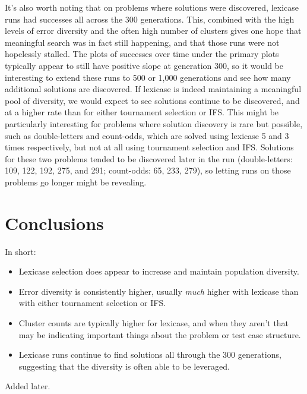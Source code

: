 It's also worth noting that on problems where solutions were discovered, lexicase runs had successes 
all across the 300 generations. This, combined with the high levels of error diversity and the often 
high number of clusters gives one hope that meaningful search was in fact still happening, and that 
those runs were not hopelessly stalled. The plots of successes over time under the primary plots
typically appear to still have positive slope at generation 300, so it would be interesting to
extend these runs to 500 or 1,000 generations and see how many additional solutions are discovered.
If lexicase is indeed maintaining a meaningful pool of diversity, we would expect to see solutions continue
to be discovered, and at a higher rate than for either tournament selection or IFS. This might be
particularly interesting for problems where solution discovery is rare but possible, such as
double-letters and count-odds, which are solved using lexicase 5 and 3 times respectively, but not
at all using tournament selection and IFS. Solutions for these two problems tended to be discovered
later in the run (double-letters: 109, 122, 192, 275, and 291; count-odds: 65, 233, 279), so letting
runs on those problems go longer might be revealing.


\section{Conclusions}

In short:
\begin{itemize}
	\item Lexicase selection does appear to increase and maintain population diversity.
	\item Error diversity is consistently higher, usually \emph{much} higher with lexicase than
	with either tournament selection or IFS.
	\item Cluster counts are typically higher for lexicase, and when they aren't that may be
	indicating important things about the problem or test case structure.
	\item Lexicase runs continue to find solutions all through the 300 generations, suggesting
	that the diversity is often able to be leveraged.
\end{itemize}

\begin{acknowledgement}
Added later.
\end{acknowledgement}



